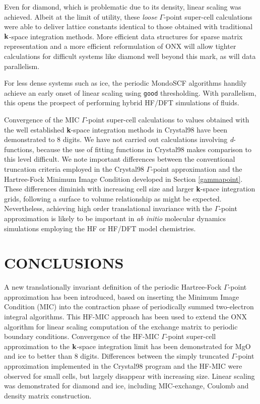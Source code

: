 \documentclass[prb,aps,nobibnotes,twocolumn,doublespace,twocolumngrid,superbib]{revtex4}
\begin{document}
Even for diamond, which is problematic due to its density, linear scaling was achieved.  
Albeit at the limit of utility, these {\it loose} $\Gamma$-point super-cell calculations were 
able to deliver lattice constants identical to those obtained with traditional 
${\bf k}$-space integration methods.  More efficient data structures for sparse 
matrix representation and a more efficient reformulation of {\sc ONX} will allow 
tighter calculations for difficult systems like diamond well beyond this mark, 
as will data parallelism.  

For less dense systems such as ice, the periodic {\sc MondoSCF} algorithms handily 
achieve an early onset of linear scaling using {\tt good} thresholding.  With parallelism,
this opens the prospect of performing hybrid HF/DFT simulations of fluids. 

Convergence of the MIC $\Gamma$-point super-cell calculations to values obtained with 
the well established {{\bf k}}-space integration methods in {\sc Crystal98} have been 
demonstrated to 8 digits.  We have not carried out calculations involving 
{\it d}-functions, because the use of fitting functions in {\sc Crystal98} makes
comparison to this level difficult.  We note important differences between the 
conventional truncation criteria employed in the {\sc Crystal98} $\Gamma$-point
approximation and the Hartree-Fock Minimum Image Condition developed in Section 
\ref{gammapoint}.  These differences diminish with increasing cell size and larger 
{\bf k}-space integration grids, following a surface to volume relationship 
as might be expected. 
Nevertheless, achieving high order translational invariance 
with the $\Gamma$-point approximation is likely to be important in {\em ab initio} 
molecular dynamics simulations employing the HF or HF/DFT model chemistries.


\section{CONCLUSIONS}\label{conclusions}

A new translationally invariant definition of the periodic Hartree-Fock 
$\Gamma$-point approximation has been introduced, based on inserting 
the Minimum Image Condition (MIC) into the contraction phase of periodically
summed two-electron integral algorithms.  This HF-MIC approach has been used 
to extend the {\sc ONX} algorithm for linear scaling computation of the exchange 
matrix to periodic boundary conditions.  Convergence of the HF-MIC $\Gamma$-point
super-cell approximation to the ${\bf k}$-space integration limit has been 
demonstrated for MgO and ice to better than 8 digits.  Differences between
the simply truncated $\Gamma$-point approximation implemented in the 
{\sc Crystal98} program and the HF-MIC were observed for small cells, but
largely disappear with increasing size. Linear scaling was demonstrated for
diamond and ice, including MIC-exchange, Coulomb and density matrix 
construction.   
\end{document}
